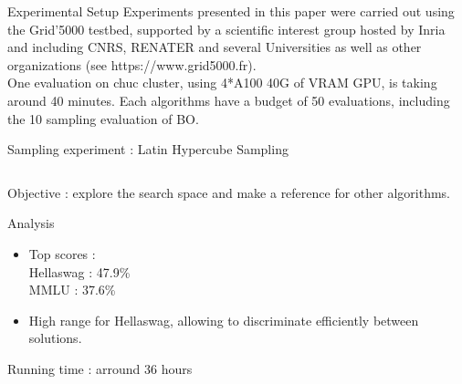 \begin{frame}{Experimental Setup}
    Experiments presented in this paper were carried out using the Grid'5000 testbed, supported by a scientific interest group hosted by Inria and including CNRS, RENATER and several Universities as well as other organizations (see https://www.grid5000.fr).\\


    One evaluation on chuc cluster, using 4*A100 40G of VRAM GPU, is taking around 40 minutes. Each algorithms have a budget of 50 evaluations, including the 10 sampling evaluation of BO. 
    
\end{frame}
\begin{frame}[allowframebreaks]{Sampling experiment : Latin Hypercube Sampling}
    
    \begin{columns}
        \begin{column}{0.45\textwidth}
        Objective : explore the search space and make a reference for other algorithms.
        \begin{block}{Analysis}
            \begin{itemize}
                \item Top scores : \\ \quad Hellaswag : 47.9\% \\ \quad MMLU : 37.6\%
                \item High range for Hellaswag, allowing to discriminate efficiently between solutions.
            \end{itemize}
            
        Running time : arround 36 hours
        
        \end{block}   
    \end{column}


\end{columns}
\end{frame}
